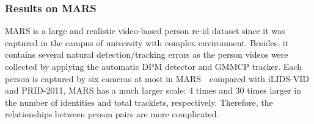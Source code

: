 \documentclass[journal]{IEEEtran}
\begin{document}
%






\subsubsection{Results on MARS}\label{res_mars}
MARS is a large and realistic video-based person re-id dataset since it was captured in the campus of  university with complex environment. Besides, it contains several natural detection/tracking errors as the person videos were collected by applying the automatic DPM detector and GMMCP tracker. Each person is captured by six cameras at most in MARS~\textemdash~compared with iLIDS-VID and PRID-2011, MARS has a much larger scale: 4 times and 30 times larger in the number of identities and total tracklets, respectively. Therefore, the relationships between person pairs are more complicated. 
\end{document}
